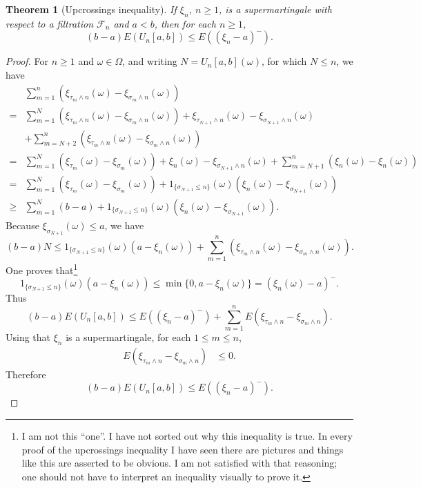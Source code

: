 \documentclass{article}
\newtheorem{theorem}{Theorem}
\theoremstyle{definition}
\begin{document}
\begin{theorem}[Upcrossings inequality]
If $\xi_n$, $n \geq 1$, is a supermartingale with respect to a filtration $\mathscr{F}_n$ and $a<b$, then for each $n \geq 1$,
\[
(b-a) E(U_n[a,b]) \leq E((\xi_n-a)^-).
\]
\end{theorem}
\begin{proof}
For $n \geq 1$ and $\omega \in \Omega$, and writing $N=U_n[a,b](\omega)$, for which $N \leq n$, we have
\[
\begin{split}
&\sum_{m=1}^n (\xi_{\tau_m \wedge n}(\omega) - \xi_{\sigma_m \wedge n}(\omega))\\
=&\sum_{m=1}^N (\xi_{\tau_m \wedge n}(\omega) - \xi_{\sigma_m \wedge n}(\omega))
+\xi_{\tau_{N+1} \wedge n}(\omega)-\xi_{\sigma_{N+1} \wedge n}(\omega)\\
&
+\sum_{m=N+2}^n (\xi_{\tau_m \wedge n}(\omega) - \xi_{\sigma_m \wedge n}(\omega))\\
=&\sum_{m=1}^N (\xi_{\tau_m}(\omega)-\xi_{\sigma_m}(\omega))
+\xi_n(\omega)-\xi_{\sigma_{N+1} \wedge n}(\omega)
+\sum_{m=N+1}^n (\xi_n(\omega)-\xi_n(\omega))\\
=&\sum_{m=1}^N (\xi_{\tau_m}(\omega)-\xi_{\sigma_m}(\omega))
+1_{\{\sigma_{N+1} \leq n\}}(\omega) (\xi_n(\omega)-\xi_{\sigma_{N+1}}(\omega))\\
\geq&\sum_{m=1}^N (b-a)+1_{\{\sigma_{N+1} \leq n\}}(\omega) (\xi_n(\omega)-\xi_{\sigma_{N+1}}(\omega)).
\end{split}
\]
Because $\xi_{\sigma_{N+1}}(\omega) \leq a$, we have
\[
(b-a)N \leq 1_{\{\sigma_{N+1} \leq n\}}(\omega) (a-\xi_n(\omega)) + 
\sum_{m=1}^n (\xi_{\tau_m \wedge n}(\omega) - \xi_{\sigma_m \wedge n}(\omega)).
\]
One proves that\footnote{I am not this ``one''. I have not sorted out why this inequality is true. In every proof of the upcrossings inequality
I have seen there are pictures and things like this are asserted to be obvious. I am not satisfied with that reasoning; one should
not have to interpret an inequality visually to prove it.}
\[
1_{\{\sigma_{N+1} \leq n\}}(\omega) (a-\xi_n(\omega))  \leq \min\{0,a-\xi_n(\omega)\} = (\xi_n(\omega)-a)^-.
\]
Thus
\[
(b-a)E(U_n[a,b]) \leq E((\xi_n-a)^-)+\sum_{m=1}^n E(\xi_{\tau_m \wedge n} - \xi_{\sigma_m \wedge n}).
\]
Using that $\xi_n$ is a supermartingale, for each $1 \leq m \leq n$,
\begin{align*}
E(\xi_{\tau_m \wedge n} - \xi_{\sigma_m \wedge n})&\leq 0.
\end{align*}
Therefore
\[
(b-a)E(U_n[a,b]) \leq E((\xi_n-a)^-).
\]
\end{proof}
\end{document}
